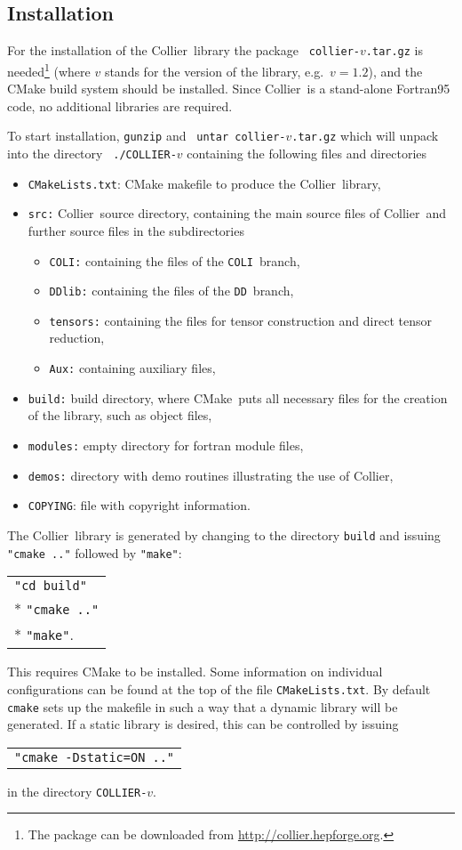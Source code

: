 \documentclass[preprint,sort&compress,12pt]{elsarticle}
\makeatletter
\def\bce{\begin{center}}
\def\ece{\end{center}}
\def\eg{e.g.\ }
\newcommand{\collier}{{\sc Collier}}
\newcommand{\coli}{{\tt COLI}}
\newcommand{\DD}{{\tt DD}}
\newcommand{\cmake}{{\sc CMake}}
\newlength{\parwidth}\newlength{\colonewidth}%
\newcommand{\cpcsub}[1]
{%
\setlength{\parwidth}{\textwidth}\addtolength{\parwidth}{-2.1em}%
\bce
\begin{tabular}[t]{@{}p{\parwidth}@{}}
#1
\end{tabular}
\ece
}%
\makeatother
\begin{document}
\subsection{Installation}
\label{subsec:install}

For the installation of the \collier\ library the package 
{\tt
  collier-$v$.tar.gz} is needed\footnote{The package can be downloaded from 
\href{http://collier.hepforge.org/}{\mbox{http://collier.hepforge.org}}.}
 (where {\tt $v$} stands for the version of the library, \eg {\tt $v=1.2$}),
  and the {\sc CMake} build system
should be installed.  Since \collier\ is a stand-alone Fortran95
code, no additional libraries are required.  

To start installation, {\tt gunzip} and {\tt
  untar collier-$v$.tar.gz} 
  which will unpack into the directory {\tt
  ./COLLIER-$v$} 
  containing the following files and directories
\begin{itemize}
\item {\tt CMakeLists.txt}:  {\sc CMake} makefile to produce the
  \collier\ library,
\item {\tt src:}
\collier\ source directory, containing the main source files  of
\collier\ and further source files in the subdirectories
\begin{itemize}
\item {\tt COLI:} containing the files of the \coli\ branch, 
\item {\tt DDlib:} containing the files of the \DD\ branch,
\item {\tt tensors:} containing the files for tensor construction and
direct tensor reduction,
\item {\tt Aux:} containing auxiliary files, 
\end{itemize}
\item {\tt build:} build directory, where \cmake\ puts all necessary
  files for the creation of the library, such as
object files,
\item {\tt modules:} empty directory for fortran module files,
\item {\tt demos:} directory with demo routines illustrating the use
  of \collier,
\item {\tt COPYING}:  file with copyright information.
\end{itemize}

The \collier\ library is generated by changing 
to the directory {\tt build}
and issuing {\tt "cmake .."} followed by {\tt "make"}:
\cpcsub{%
  {\tt "cd build"}\\*
  {\tt "cmake .."}\\*
  {\tt "make"}\;.
} 
This requires {\sc CMake} to be installed.  Some
information on individual configurations can be found at the top of
the file {\tt CMakeLists.txt}. By default {\tt cmake} sets up the
makefile in such a way
that a dynamic library will be generated. If a static
library is desired, this can be controlled by issuing 
\cpcsub{%
  {\tt "cmake -Dstatic=ON .."} 
} 
in the directory {\tt COLLIER-$v$}.
\end{document}

